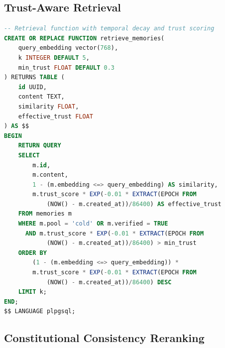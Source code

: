 \subsection{Trust-Aware Retrieval}

\begin{lstlisting}[language=SQL,caption={Trust-Weighted Similarity Search}]
-- Retrieval function with temporal decay and trust scoring
CREATE OR REPLACE FUNCTION retrieve_memories(
    query_embedding vector(768),
    k INTEGER DEFAULT 5,
    min_trust FLOAT DEFAULT 0.3
) RETURNS TABLE (
    id UUID,
    content TEXT,
    similarity FLOAT,
    effective_trust FLOAT
) AS $$
BEGIN
    RETURN QUERY
    SELECT
        m.id,
        m.content,
        1 - (m.embedding <=> query_embedding) AS similarity,
        m.trust_score * EXP(-0.01 * EXTRACT(EPOCH FROM
            (NOW() - m.created_at))/86400) AS effective_trust
    FROM memories m
    WHERE m.pool = 'cold' OR m.verified = TRUE
      AND m.trust_score * EXP(-0.01 * EXTRACT(EPOCH FROM
            (NOW() - m.created_at))/86400) > min_trust
    ORDER BY
        (1 - (m.embedding <=> query_embedding)) *
        m.trust_score * EXP(-0.01 * EXTRACT(EPOCH FROM
            (NOW() - m.created_at))/86400) DESC
    LIMIT k;
END;
$$ LANGUAGE plpgsql;
\end{lstlisting}

\subsection{Constitutional Consistency Reranking}

